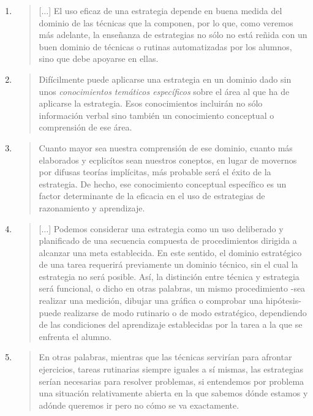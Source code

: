 \documentclass{article}
\begin{document}
\begin{enumerate}
  \item \begin{quote}
[$\ldots$] El uso eficaz de una estrategia depende en  buena medida del dominio de las técnicas que la componen, por lo que, como veremos más adelante, la enseñanza de estrategias no sólo no está reñida con un buen dominio de técnicas o rutinas automatizadas por los alumnos, sino que debe apoyarse en ellas.
  \end{quote}

  \item \begin{quote}
  Difícilmente puede aplicarse una estrategia 	en un dominio dado sin unos \textit{conocimientos temáticos específicos} sobre el área al que ha de aplicarse la estrategia. Esos conocimientos incluirán no sólo información verbal sino también un conocimiento conceptual o comprensión de ese área.   
  \end{quote}

  \item \begin{quote}
  Cuanto mayor sea nuestra comprensión de ese dominio, cuanto más elaborados y ecplicítos sean nuestros coneptos, en lugar de movernos por difusas teorías implícitas, más probable será el éxito de la estrategia. De hecho, ese conocimiento conceptual específico es un factor determinante de la eficacia en el uso de estrategias de razonamiento y aprendizaje.
  \end{quote}

  \item \begin{quote}
  [$\ldots$] Podemos considerar una estrategia como un uso deliberado y planificado de una secuencia compuesta de procedimientos dirigida a alcanzar una meta establecida. En este sentido, el dominio estratégico de una tarea requerirá previamente un dominio técnico, sin el cual la estrategia no será posible. Así, la distinción entre técnica y estrategia será funcional, o dicho en otras palabras, un mismo procedimiento -sea realizar una medición, dibujar una gráfica o comprobar una hipótesis- puede realizarse de modo rutinario o de modo estratégico, dependiendo de las condiciones del aprendizaje establecidas por la tarea a la que se enfrenta el alumno.
  \end{quote}

  \item \begin{quote}
  En otras palabras, mientras que las técnicas servirían para afrontar ejercicios, tareas rutinarias siempre iguales a sí mismas, las estrategias serían necesarias para resolver problemas, si entendemos por problema una situación relativamente abierta en la que sabemos dónde estamos y adónde queremos ir pero no cómo se va exactamente. 
  \end{quote}
\end{enumerate}
\end{document}
